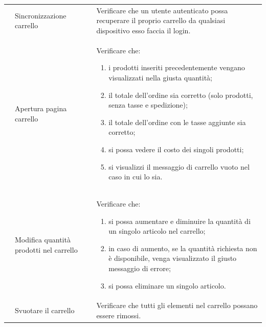 \begin{center}
\begin{longtable}{|p{1cm}|p{4.85cm}|p{9cm}|}
		 & Sincronizzazione carrello & Verificare che un utente autenticato possa recuperare il proprio carrello da qualsiasi dispositivo esso faccia il login.\\

		 & Apertura pagina carrello & Verificare che: 
		\begin{enumerate}
			\item i prodotti inseriti precedentemente vengano visualizzati nella giusta quantità;
			\item il totale dell'ordine sia corretto (solo prodotti, senza tasse e spedizione);
			\item il totale dell'ordine con le tasse aggiunte sia corretto;
			\item si possa vedere il costo dei singoli prodotti;
			\item si visualizzi il messaggio di carrello vuoto nel caso in cui lo sia.
		\end{enumerate} \\

		 & Modifica quantità prodotti nel carrello & Verificare che:
		\begin{enumerate}
			\item si possa aumentare e diminuire la quantità di un singolo articolo nel carrello;
			\item in caso di aumento, se la quantità richiesta non è disponibile, venga visualizzato il giusto messaggio di errore;
			\item si possa eliminare un singolo articolo.
		\end{enumerate}\\

		 & Svuotare il carrello & Verificare che tutti gli elementi nel carrello possano essere rimossi. \\


\end{longtable}
\end{center}
